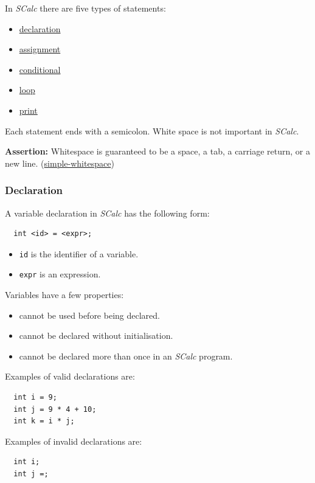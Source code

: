 \documentclass{article}
\newcommand{\code}[1]{\texttt{\textmd{#1}}}
\newcommand{\assertion}[2]{\textbf{Assertion: }#1 (\hyperlink{#2}{#2})}
\begin{document}
In \textit{SCalc} there are five types of statements:

\begin{itemize}
  \item \hyperref[sssec:declaration]{declaration}
  \item \hyperref[sssec:assignment]{assignment}
  \item \hyperref[sssec:conditional]{conditional}
  \item \hyperref[sssec:loop]{loop}
  \item \hyperref[sssec:print]{print}
\end{itemize}

Each statement ends with a semicolon. White space is not important in \textit{SCalc}.

\assertion{Whitespace is guaranteed to be a space, a tab, a carriage return, or a new
line.}{simple-whitespace}

\subsubsection{Declaration}
\label{sssec:declaration}
A variable declaration in \textit{SCalc} has the following form:
\begin{lstlisting}
  int <id> = <expr>;
\end{lstlisting}

\begin{itemize}
  \item \code{id} is the identifier of a variable.
  \item \code{expr} is an expression.
\end{itemize}

Variables have a few properties:\hypertarget{variable-props}{}
\begin{itemize}
  \item cannot be used before being declared.
  \item cannot be declared without initialisation.
  \item cannot be declared more than once in an \textit{SCalc} program.
\end{itemize}

Examples of valid declarations are:
\begin{lstlisting}
  int i = 9;
  int j = 9 * 4 + 10;
  int k = i * j;
\end{lstlisting}

Examples of invalid declarations are:
\begin{lstlisting}
  int i;
  int j =;
\end{lstlisting}
\end{document}

